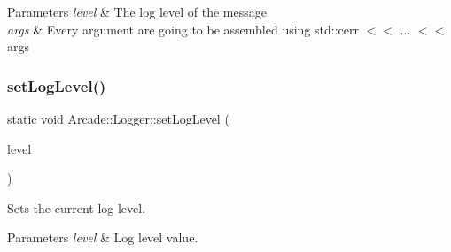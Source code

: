 \begin{DoxyParams}{Parameters}
{\em level} & The log level of the message \\
\hline
{\em args} & Every argument are going to be assembled using std\+::cerr $<$$<$ ... $<$$<$ args \\
\hline
\end{DoxyParams}
\mbox{\label{classArcade_1_1Logger_a60d1ef9de9500d0864fca8f571e062e5}} 
\subsubsection{\texorpdfstring{setLogLevel()}{setLogLevel()}}
{\footnotesize\ttfamily static void Arcade\+::\+Logger\+::set\+Log\+Level (\begin{DoxyParamCaption}\item[{\mbox{\hyperlink{classArcade_1_1Logger_a9b6365ec3dfe94ac7d296ad60d4b3b20}{Log\+Level}}}]{level }\end{DoxyParamCaption})\hspace{0.3cm}{\ttfamily [static]}}



Sets the current log level. 


\begin{DoxyParams}{Parameters}
{\em level} & Log level value. \\
\hline
\end{DoxyParams}
